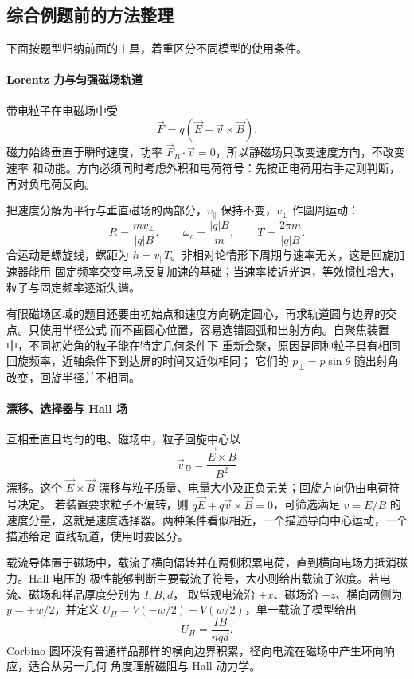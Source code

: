 \subsection*{综合例题前的方法整理}

下面按题型归纳前面的工具，着重区分不同模型的使用条件。

\paragraph{Lorentz 力与匀强磁场轨道}

带电粒子在电磁场中受
\[
 \vec F=q(\vec E+\vec v\times\vec B).
\]
磁力始终垂直于瞬时速度，功率 $\vec F_B\cdot\vec v=0$，所以静磁场只改变速度方向，不改变速率
和动能。方向必须同时考虑外积和电荷符号：先按正电荷用右手定则判断，再对负电荷反向。

把速度分解为平行与垂直磁场的两部分，$v_\parallel$ 保持不变，$v_\perp$ 作圆周运动：
\[
 R=\frac{mv_\perp}{|q|B},\qquad
 \omega_c=\frac{|q|B}{m},\qquad
 T=\frac{2\pi m}{|q|B}.
\]
合运动是螺旋线，螺距为 $h=v_\parallel T$。非相对论情形下周期与速率无关，这是回旋加速器能用
固定频率交变电场反复加速的基础；当速率接近光速，等效惯性增大，粒子与固定频率逐渐失谐。

有限磁场区域的题目还要由初始点和速度方向确定圆心，再求轨道圆与边界的交点。只使用半径公式
而不画圆心位置，容易选错圆弧和出射方向。自聚焦装置中，不同初始角的粒子能在特定几何条件下
重新会聚，原因是同种粒子具有相同回旋频率，近轴条件下到达屏的时间又近似相同；
它们的 $p_\perp=p\sin\theta$ 随出射角改变，回旋半径并不相同。

\paragraph{漂移、选择器与 Hall 场}

互相垂直且均匀的电、磁场中，粒子回旋中心以
\[
 \vec v_D=\frac{\vec E\times\vec B}{B^2}
\]
漂移。这个 $\vec E\times\vec B$ 漂移与粒子质量、电量大小及正负无关；回旋方向仍由电荷符号决定。
若装置要求粒子不偏转，则 $q\vec E+q\vec v\times\vec B=0$，可筛选满足
$v=E/B$ 的速度分量，这就是速度选择器。两种条件看似相近，一个描述导向中心运动，一个描述给定
直线轨道，使用时要区分。

载流导体置于磁场中，载流子横向偏转并在两侧积累电荷，直到横向电场力抵消磁力。Hall 电压的
极性能够判断主要载流子符号，大小则给出载流子浓度。若电流、磁场和样品厚度分别为 $I,B,d$，
取常规电流沿 $+x$、磁场沿 $+z$、横向两侧为 $y=\pm w/2$，并定义
$U_H=V(-w/2)-V(w/2)$，单一载流子模型给出
\[
 U_H=\frac{IB}{nqd}.
\]
Corbino 圆环没有普通样品那样的横向边界积累，径向电流在磁场中产生环向响应，适合从另一几何
角度理解磁阻与 Hall 动力学。

